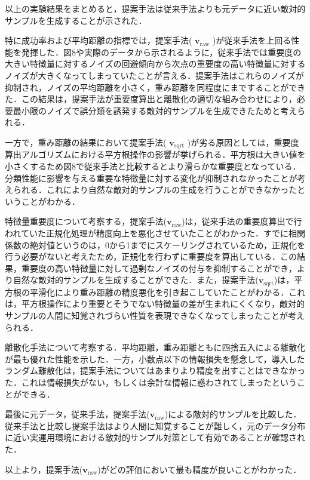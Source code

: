 以上の実験結果をまとめると，提案手法は従来手法よりも元データに近い敵対的サンプルを生成することが示された．

特に成功率および平均距離の指標では，提案手法( $\bm{v}_{\mathrm{raw}}$ )が従来手法を上回る性能を発揮した．図8や実際のデータから示されるように，従来手法では重要度の大きい特徴量に対するノイズの回避傾向から次点の重要度の高い特徴量に対するノイズが大きくなってしまっていたことが言える．提案手法はこれらのノイズが抑制され，ノイズの平均距離を小さく，重み距離を同程度にまですることができた．この結果は，提案手法が重要度算出と離散化の適切な組み合わせにより，必要最小限のノイズで誤分類を誘発する敵対的サンプルを生成できたためと考えられる．

一方で，重み距離の結果において提案手法( $\bm{v}_{\mathrm{sqrt}}$ )が劣る原因としては，重要度算出アルゴリズムにおける平方根操作の影響が挙げられる．平方根は大きい値を小さくするため図8で従来手法と比較するとより滑らかな重要度となっている．分類性能に影響を与える重要な特徴量に対する変化が抑制されなかったことが考えられる．これにより自然な敵対的サンプルの生成を行うことができなかったということがわかる．

特徴量重要度について考察する，提案手法($\bm{v}_{\mathrm{raw}}$)は，従来手法の重要度算出で行われていた正規化処理が精度向上を悪化させていたことがわかった．すでに相関係数の絶対値というのは，0から1までにスケーリングされているため，正規化を行う必要がないと考えたため，正規化を行わずに重要度を算出している．この結果，重要度の高い特徴量に対して過剰なノイズの付与を抑制することができ，より自然な敵対的サンプルを生成することができた．また，提案手法($\bm{v}_{\mathrm{sqrt}}$)は，平方根の平滑化により重み距離の精度悪化を引き起こしていたことがわかる．これは，平方根操作により重要とそうでない特徴量の差が生まれにくくなり，敵対的サンプルの人間に知覚されづらい性質を表現できなくなってしまったことが考えられる．

離散化手法について考察する．平均距離，重み距離ともに四捨五入による離散化が最も優れた性能を示した．一方，小数点以下の情報損失を懸念して，導入したランダム離散化は，提案手法についてはあまりより精度を出すことはできなかった．これは情報損失がない，もしくは余計な情報に惑わされてしまったということができる．

最後に元データ，従来手法，提案手法($\bm{v}_{\mathrm{raw}}$)による敵対的サンプルを比較した．従来手法と比較し提案手法はより人間に知覚することが難しく，元のデータ分布に近い実運用環境における敵対的サンプル対策として有効であることが確認された．


以上より，提案手法($\bm{v}_{\mathrm{raw}}$)がどの評価において最も精度が良いことがわかった．